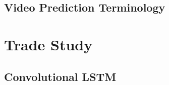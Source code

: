\documentclass{scrartcl}
\begin{document}

\subsection{Video Prediction Terminology}
\label{subsec:intro_terminology}

\newpage
\section{Trade Study}
\label{sec:related-work}

\subsection{Convolutional LSTM}
\label{subsec:conv_lstm}

\newpage
\section{}
\label{}

\newpage
\section{}
\label{}

\newpage
\section{}
\label{}

\newpage
\section{}
\label{}



\newpage

\newpage
\end{document}
